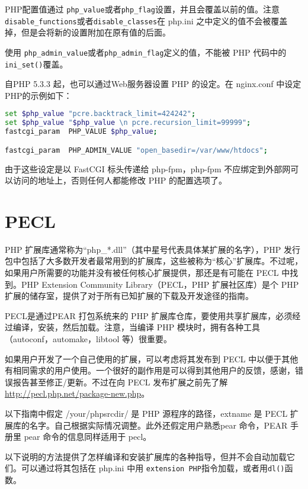 PHP配置值通过 \texttt{php\_value}或者\texttt{php\_flag}设置，并且会覆盖以前的值。注意\texttt{disable\_functions}或者\texttt{disable\_classes}在 php.ini 之中定义的值不会被覆盖掉，但是会将新的设置附加在原有值的后面。

使用 \texttt{php\_admin\_value}或者\texttt{php\_admin\_flag}定义的值，不能被 PHP 代码中的 \texttt{ini\_set()}覆盖。

自PHP 5.3.3 起，也可以通过Web服务器设置 PHP 的设定。在 nginx.conf 中设定 PHP的示例如下：

\begin{lstlisting}[language=bash]
set $php_value "pcre.backtrack_limit=424242";
set $php_value "$php_value \n pcre.recursion_limit=99999";
fastcgi_param  PHP_VALUE $php_value;

fastcgi_param  PHP_ADMIN_VALUE "open_basedir=/var/www/htdocs";
\end{lstlisting}

由于这些设定是以 FastCGI 标头传递给 php-fpm，php-fpm 不应绑定到外部网可以访问的地址上，否则任何人都能修改 PHP 的配置选项了。

\section{PECL}

PHP 扩展库通常称为“php\_*.dll”（其中星号代表具体某扩展的名字），PHP 发行包中包括了大多数开发者最常用到的扩展库，这些被称为“核心”扩展库。不过呢，如果用户所需要的功能并没有被任何核心扩展提供，那还是有可能在 PECL 中找到。PHP Extension Community Library（PECL，PHP 扩展社区库）是个 PHP 扩展的储存室，提供了对于所有已知扩展的下载及开发途径的指南。

PECL是通过PEAR 打包系统来的 PHP 扩展库仓库，要使用共享扩展库，必须经过编译，安装，然后加载。注意，当编译 PHP 模块时，拥有各种工具（autoconf，automake，libtool 等）很重要。

如果用户开发了一个自己使用的扩展，可以考虑将其发布到 PECL 中以便于其他有相同需求的用户使用。一个很好的副作用是可以得到其他用户的反馈，感谢，错误报告甚至修正/更新。不过在向 PECL 发布扩展之前先了解\url{http://pecl.php.net/package-new.php}。



以下指南中假定 /your/phpsrcdir/ 是 PHP 源程序的路径，extname 是 PECL 扩展库的名字。自己根据实际情况调整。此外还假定用户熟悉pear 命令，PEAR 手册里 pear 命令的信息同样适用于 pecl。

以下说明的方法提供了怎样编译和安装扩展库的各种指导，但并不会自动加载它们。可以通过将其包括在 php.ini 中用 \texttt{extension PHP}指令加载，或者用\texttt{dl()}函数。

